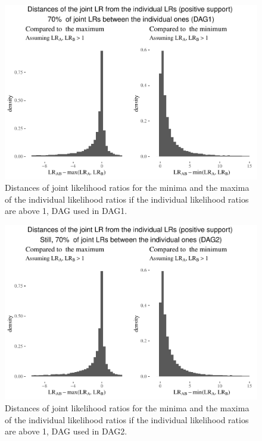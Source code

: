 \documentclass[
  10pt,
  dvipsnames,enabledeprecatedfontcommands]{scrartcl}
\begin{document}
\begin{figure}


\begin{center}\includegraphics[width=1\linewidth]{conjunction-appendix9_files/figure-latex/unnamed-chunk-15-1} \end{center}

\caption{Distances of joint likelihood ratios for the minima and the maxima of the individual likelihood ratios if the individual likelihood ratios are above 1, DAG used in \textsf{DAG1}.}
\label{fig:LRabovePlot}
\end{figure}

\begin{figure}


\begin{center}\includegraphics[width=1\linewidth]{conjunction-appendix9_files/figure-latex/unnamed-chunk-16-1} \end{center}

\caption{Distances of joint likelihood ratios for the minima and the maxima of the individual likelihood ratios if the individual likelihood ratios are above 1, DAG used in \textsf{DAG2}.}
\label{fig:LRabovePlotDep}
\end{figure}
\end{document}
